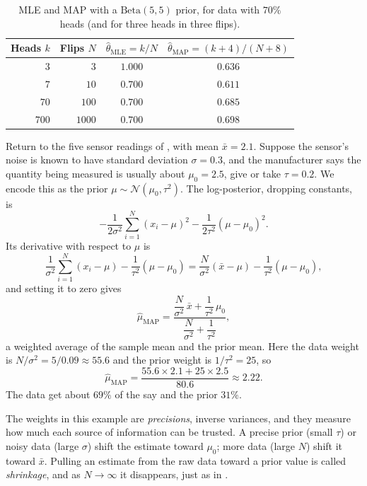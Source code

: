 \begin{table}[ht]
  \centering
  \small
  \caption{MLE and MAP with a $\text{Beta}(5, 5)$ prior, for data with
    $70\%$ heads (and for three heads in three flips).}
  \label{tab:ch06-map-vs-mle}
  \begin{tabular}{@{}rrcc@{}}
    \toprule
    Heads $k$ & Flips $N$ & $\hat\theta_{\text{MLE}} = k/N$
      & $\hat\theta_{\text{MAP}} = (k + 4)/(N + 8)$ \\
    \midrule
    $3$ & $3$ & $1.000$ & $0.636$ \\
    $7$ & $10$ & $0.700$ & $0.611$ \\
    $70$ & $100$ & $0.700$ & $0.685$ \\
    $700$ & $1000$ & $0.700$ & $0.698$ \\
    \bottomrule
  \end{tabular}
\end{table}

\begin{example}
  \label{ex:ch06-map-gaussian}
  Return to the five sensor readings of ,
  with mean $\bar{x} = 2.1$. Suppose the sensor's noise is known to have
  standard deviation $\sigma = 0.3$, and the manufacturer says the
  quantity being measured is usually about $\mu_0 = 2.5$, give or take
  $\tau = 0.2$. We encode this as the prior $\mu \sim \mathcal{N}(\mu_0,
  \tau^2)$. The log-posterior, dropping constants, is
  \[
    -\frac{1}{2\sigma^2}\sum_{i=1}^{N} (x_i - \mu)^2
    - \frac{1}{2\tau^2}(\mu - \mu_0)^2 .
  \]
  Its derivative with respect to $\mu$ is
  \[
    \frac{1}{\sigma^2}\sum_{i=1}^{N} (x_i - \mu) - \frac{1}{\tau^2}(\mu - \mu_0)
    = \frac{N}{\sigma^2}(\bar{x} - \mu) - \frac{1}{\tau^2}(\mu - \mu_0) ,
  \]
  and setting it to zero gives
  \[
    \hat\mu_{\text{MAP}}
    = \frac{\dfrac{N}{\sigma^2}\,\bar{x} + \dfrac{1}{\tau^2}\,\mu_0}
           {\dfrac{N}{\sigma^2} + \dfrac{1}{\tau^2}} ,
  \]
  a weighted average of the sample mean and the prior mean. Here the
  data weight is $N/\sigma^2 = 5/0.09 \approx 55.6$ and the prior weight
  is $1/\tau^2 = 25$, so
  \[
    \hat\mu_{\text{MAP}} = \frac{55.6 \times 2.1 + 25 \times 2.5}{80.6}
    \approx 2.22 .
  \]
  The data get about $69\%$ of the say and the prior $31\%$.
\end{example}

The weights in this example are \emph{precisions}, inverse variances,
and they measure how much each source of information can be trusted. A
precise prior (small $\tau$) or noisy data (large $\sigma$) shift the
estimate toward $\mu_0$; more data (large $N$) shift it toward
$\bar{x}$. Pulling an estimate from the raw data toward a prior value is
called \emph{shrinkage}, and as $N \to \infty$ it disappears, just as in
.

